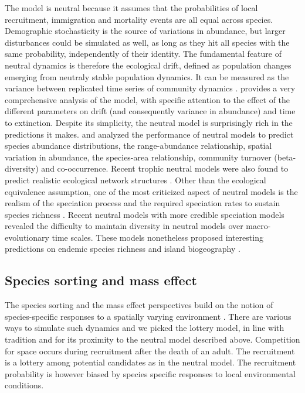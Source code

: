 \documentclass[12pt]{article}
\begin{document}
The model is neutral because it assumes that the probabilities of local
recruitment, immigration and mortality events are all equal across species.
Demographic stochasticity is the source of variations in abundance, but larger
disturbances could be simulated as well, as long as they hit all species with
the same probability, independently of their identity. The fundamental feature
of neutral dynamics is therefore the ecological drift, defined as population
changes emerging from neutraly stable population dynamics. It can be measured as
the variance between replicated time series of community dynamics
\parencite{Gravel2011a}. \textcite{Hubbell2001} provides a very comprehensive
analysis of the model, with specific attention to the effect of the different
parameters on drift (and consequently variance in abundance) and time to
extinction. Despite its simplicity, the neutral model is surprisingly rich in
the predictions it makes. \textcite{Bell2001} and \textcite{Hubbell2001}
analyzed the performance of neutral models to predict species abundance
distributions, the range-abundance relationship, spatial variation in abundance,
the species-area relationship, community turnover (beta-diversity) and
co-occurrence. Recent trophic neutral models were also found to predict
realistic ecological network structures \parencite{Canard2012}. Other than the
ecological equivalence assumption, one of the most criticized aspect of neutral
models is the realism of the speciation process and the required speciation
rates to sustain species richness \parencite{Ricklefs2003,Etienne2007}. Recent
neutral models with more credible speciation models
\parencite{Rosindell2010,Desjardins2012a} revealed the difficulty to maintain
diversity in neutral models over macro-evolutionary time scales. These models
nonetheless proposed interesting predictions on endemic species richness and
island biogeography \parencite{Rosindell2011,Desjardins2012b}.

\subsection*{Species sorting and mass effect}

The species sorting and the mass effect perspectives build on the notion of
species-specific responses to a spatially varying environment
\parencite{Leibold2004a}. There are various ways to simulate such dynamics and
we picked the lottery model, in line with tradition \parencite{Mouquet2002} and
for its proximity to the neutral model described above. Competition for space
occurs during recruitment after the death of an adult. The recruitment is a
lottery among potential candidates as in the neutral model. The recruitment probability 
is however biased by species specific responses to local environmental conditions. 
\end{document}
